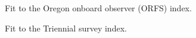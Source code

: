\documentclass[
]{scrartcl}
\begin{document}
\begin{figure}


\caption{\label{fig-indexfit9}Fit to the Oregon onboard observer (ORFS)
index.}

\end{figure}%

\begin{figure}


\caption{\label{fig-indexfit10}Fit to the Triennial survey index.}

\end{figure}%
\end{document}

